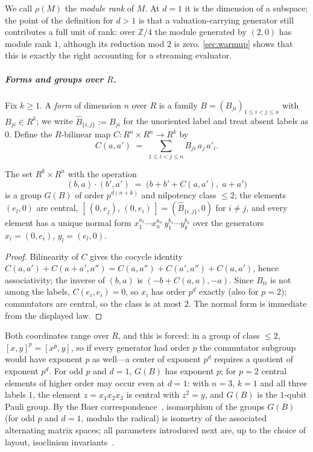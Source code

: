 \documentclass[a4paper,UKenglish,autoref,anonymous]{lipics-v2021}
\newcommand{\ZZ}{\mathbb{Z}}
\newcommand{\R}{R}                                   %
\newcommand{\mrk}{\rho}                              %
\begin{document}
We call $\mrk(M)$ the \emph{module rank} of $M$. At $d = 1$ it is the
dimension of a subspace; the point of the definition for $d > 1$ is that a
valuation-carrying generator still contributes a full unit of rank: over
$\ZZ/4$ the module generated by $(2, 0)$ has module rank $1$, although
its reduction mod $2$ is zero. \autoref{sec:warmup} shows that this is
exactly the right accounting for a streaming evaluator.

\subparagraph*{Forms and groups over $\R$.}
Fix $k \ge 1$. A \emph{form} of dimension $n$ over $\R$ is a family $B =
(B_{ji})_{1 \le i < j \le n}$ with $B_{ji} \in \R^k$; we write $\hat
B_{\{i,j\}} := B_{ji}$ for the unoriented label and treat absent labels
as $0$. Define the $\R$-bilinear map $C \colon \R^n \times \R^n \to \R^k$
by
\begin{equation}
  C(a, a') \;=\; \sum_{1 \le i < j \le n} B_{ji}\, a_j\, a'_i .
  \label{eq:cocycle}
\end{equation}

\begin{lemma}
\label{lem:cocycle}
The set $\R^k \times \R^n$ with the operation
\[
  (b, a) \cdot (b', a') \;=\; \bigl(b + b' + C(a, a'),\; a + a'\bigr)
\]
is a group $G(B)$ of order $p^{d(n+k)}$ and nilpotency class $\le 2$; the
elements $(e_l, 0)$ are central, $[\,(0, e_j),\, (0, e_i)\,] = (\hat
B_{\{i,j\}}, 0)$ for $i \ne j$, and every element has a unique normal
form $x_1^{a_1} \cdots x_n^{a_n}\, y_1^{b_1} \cdots y_k^{b_k}$ over the
generators $x_i = (0, e_i)$, $y_l = (e_l, 0)$.
\end{lemma}

\begin{proof}
Bilinearity of $C$ gives the cocycle identity $C(a, a') + C(a + a', a'')
= C(a, a'') + C(a', a'') + C(a, a')$, hence associativity; the inverse of
$(b, a)$ is $(-b + C(a, a), -a)$. Since $B_{ii}$ is not among the labels,
$C(e_i, e_i) = 0$, so $x_i$ has order $p^d$ exactly (also for $p = 2$);
commutators are central, so the class is at most $2$. The normal form is
immediate from the displayed law.
\end{proof}

Both coordinates range over $\R$, and this is forced: in a group of class
$\le 2$, $[x, y]^p = [x^p, y]$, so if every generator had order $p$ the
commutator subgroup would have exponent $p$ as well---a center of
exponent $p^d$ requires a quotient of exponent $p^d$. For odd $p$ and
$d = 1$, $G(B)$ has exponent $p$; for $p = 2$ central elements of higher
order may occur even at $d = 1$: with $n = 3$, $k = 1$ and all three
labels $1$, the element $z = x_1 x_2 x_3$ is central with $z^2 = y$, and
$G(B)$ is the $1$-qubit Pauli group. By the Baer
correspondence~\cite{Baer1938}, isomorphism of the groups $G(B)$ (for
odd $p$ and $d = 1$, modulo the radical) is isometry of the associated
alternating matrix spaces; all parameters introduced next are, up to the
choice of layout, isoclinism invariants~\cite{Hall1940}.
\end{document}
